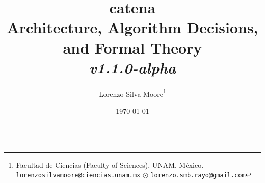 \documentclass[11pt, a4paper]{article}
\title{\textbf{catena} \\[0.5em]
       \large Architecture, Algorithm Decisions, and Formal Theory \\[0.5em]
       \large \textit{v1.1.0-alpha}}
\author{Lorenzo Silva Moore\footnote{Facultad de Ciencias (Faculty of Sciences), UNAM, México.\\\indent\indent \texttt{lorenzosilvamoore@ciencias.unam.mx} $\odot$ \texttt{lorenzo.smb.rayo@gmail.com}}}
\date{\today}
\theoremstyle{plain}
\theoremstyle{definition}
\begin{document}
\maketitle
\tableofcontents
\bigskip
\hrule
\bigskip







% 













\printbibliography
\end{document}
